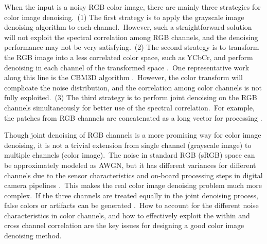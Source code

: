 When the input is a noisy RGB color image, there are mainly three strategies for color image denoising.\ (1) The first strategy is to apply the grayscale image denoising algorithm to each channel.\ However, such a straightforward solution will not exploit the spectral correlation among RGB channels, and the denoising performance may not be very satisfying.\ (2) The second strategy is to transform the RGB image into a less correlated color space, such as YCbCr, and perform denoising in each channel of the transformed space \cite{foe,cbm3d}.\ One representative work along this line is the CBM3D algorithm \cite{cbm3d}.\ However, the color transform will complicate the noise distribution, and the correlation among color channels is not fully exploited.\ (3) The third strategy is to perform joint denoising on the RGB channels simultaneously for better use of the spectral correlation.\ For example, the patches from RGB channels are concatenated as a long vector for processing \cite{mairal2008sparse,Zhu_2016_CVPR}. 

Though joint denoising of RGB channels is a more promising way for color image denoising, it is not a trivial extension from single channel (grayscale image) to multiple channels (color image).\ The noise in standard RGB (sRGB) space can be approximately modeled as AWGN, but it has different variances for different channels \cite{Liu2008,Leungtip,crosschannel2016} due to the sensor characteristics and on-board processing steps in digital camera pipelines \cite{crosschannel2016,karaimer_brown_ECCV_2016}.\ This makes the real color image denoising problem much more complex.\ If the three channels are treated equally in the joint denoising process, false colors or artifacts can be generated \cite{mairal2008sparse}.\ How to account for the different noise characteristics in color channels, and how to effectively exploit the within and cross channel correlation are the key issues for designing a good color image denoising method.

